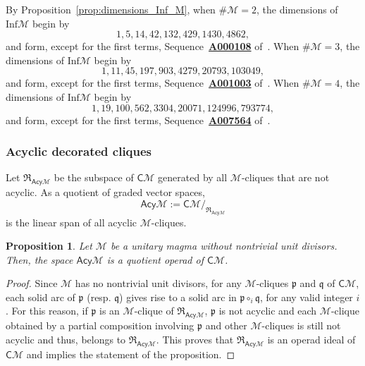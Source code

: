 \documentclass[10pt,reqno]{amsart}
\numberwithin{equation}{subsection}
\newtheorem{Proposition}[Theorem]{Proposition}
\newcommand{\Mca}{\mathcal{M}}
\newcommand{\Pfr}{\mathfrak{p}}
\newcommand{\Qfr}{\mathfrak{q}}
\newcommand{\Cli}{\mathsf{C}}
\newcommand{\Acy}{\mathsf{Acy}}
\newcommand{\Inf}{\mathrm{Inf}}
\newcommand{\Rel}{\mathfrak{R}}
\newcommand{\OEIS}[1]{\href{http://oeis.org/#1}{{\bf #1}}}
\begin{document}
By Proposition~\ref{prop:dimensions_Inf_M}, when $\# \Mca = 2$, the
dimensions of $\Inf\Mca$ begin by
\begin{equation}
    1, 5, 14, 42, 132, 429, 1430, 4862,
\end{equation}
and form, except for the first terms, Sequence~\OEIS{A000108}
of~\cite{Slo}. When $\# \Mca = 3$, the dimensions of
$\Inf\Mca$ begin by
\begin{equation}
    1, 11, 45, 197, 903, 4279, 20793, 103049,
\end{equation}
and form, except for the first terms, Sequence~\OEIS{A001003}
of~\cite{Slo}. When $\# \Mca = 4$, the dimensions of
$\Inf\Mca$ begin by
\begin{equation}
    1, 19, 100, 562, 3304, 20071, 124996, 793774,
\end{equation}
and form, except for the first terms, Sequence~\OEIS{A007564}
of~\cite{Slo}.
\medskip

\subsubsection{Acyclic decorated cliques}%
\label{subsubsec:quotient_Cli_M_acyclic}
Let $\Rel_{\Acy\Mca}$ be the subspace of $\Cli\Mca$ generated by all
$\Mca$-cliques that are not acyclic. As a quotient of graded vector
spaces,
\begin{equation}
    \Acy\Mca := \Cli\Mca/_{\Rel_{\Acy\Mca}}
\end{equation}
is the linear span of all acyclic $\Mca$-cliques.
\medskip

\begin{Proposition} \label{prop:quotient_Cli_M_acyclic}
    Let $\Mca$ be a unitary magma without nontrivial unit divisors.
    Then, the space $\Acy\Mca$ is a quotient operad of $\Cli\Mca$.
\end{Proposition}
\begin{proof}
    Since $\Mca$ has no nontrivial unit divisors, for any $\Mca$-cliques
    $\Pfr$ and $\Qfr$ of $\Cli\Mca$, each solid arc of $\Pfr$ (resp.
    $\Qfr$) gives rise to a solid arc in $\Pfr \circ_i \Qfr$, for any
    valid integer $i$. For this reason, if $\Pfr$ is an $\Mca$-clique of
    $\Rel_{\Acy\Mca}$, $\Pfr$ is not acyclic and each $\Mca$-clique
    obtained by a partial composition involving $\Pfr$ and other
    $\Mca$-cliques is still not acyclic and thus, belongs to
    $\Rel_{\Acy\Mca}$. This proves that $\Rel_{\Acy\Mca}$ is an operad
    ideal of $\Cli\Mca$ and implies the statement of the proposition.
\end{proof}
\medskip
\end{document}
